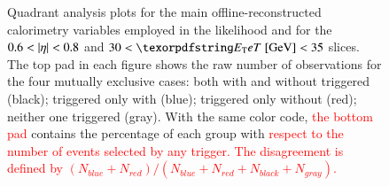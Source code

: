 \begin{figure}[h!]


\caption{%
	Quadrant analysis plots for the main offline-reconstructed
	calorimetry variables employed in the
	likelihood and for the $0.6<\abseta{}<0.8$ and
	$30<\et{}~[\text{GeV}]<35$ slices. 
	The top pad in each figure shows the raw number of observations for the four mutually exclusive cases: both with and without \rnn{}
	triggered (black); triggered only with \rnn{} (blue); triggered only without \rnn{} (red); neither one triggered (gray). With the same color code, \textcolor{red}{the bottom pad} contains the percentage of each group with \textcolor{red}{respect to the number of events selected by any trigger. The disagreement is defined by $(N_{blue}+N_{red})/(N_{blue}+N_{red}+N_{black}+N_{gray})$.}
}
\end{figure}

